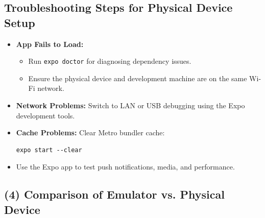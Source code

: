 \documentclass[12pt]{article}
\begin{document}
\subsection*{Troubleshooting Steps for Physical Device Setup}
\begin{itemize}
    \item \textbf{App Fails to Load:}
    \begin{itemize}
        \item Run \texttt{expo doctor} for diagnosing dependency issues.
        \item Ensure the physical device and development machine are on the same Wi-Fi network.
    \end{itemize}
    \item \textbf{Network Problems:} Switch to LAN or USB debugging using the Expo development tools.
    \item \textbf{Cache Problems:} Clear Metro bundler cache:
    \begin{verbatim}
expo start --clear
    \end{verbatim}
    \item Use the Expo app to test push notifications, media, and performance.
\end{itemize}

\subsection*{(4) Comparison of Emulator vs. Physical Device}
\end{document}
